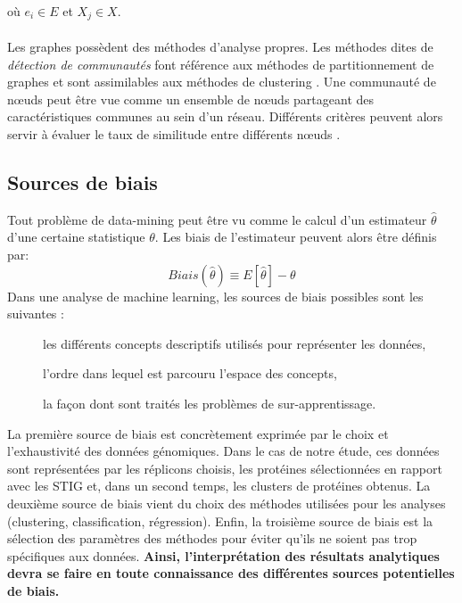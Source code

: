 où $e_{i} \in E$ et $X_{j} \in X$.\\
\\
Les graphes possèdent des méthodes d'analyse propres. Les méthodes dites de \textit{détection de communautés} font référence aux méthodes de partitionnement de graphes et sont assimilables aux méthodes de clustering \citep{Coscia2011}. Une communauté de nœuds peut être vue comme un ensemble de nœuds partageant des caractéristiques communes au sein d'un réseau. Différents critères peuvent alors servir à évaluer le taux de similitude entre différents nœuds \citep{Coscia2011}.


\subsection{Sources de biais}
Tout problème de data-mining peut être vu comme le calcul d'un estimateur $\hat{\theta}$ d'une certaine statistique $\theta$. Les biais de l'estimateur peuvent alors être définis par: 
\begin{equation}
Biais(\hat{\theta})\equiv E[\hat{\theta}]-\theta
\end{equation}
Dans une analyse de machine learning, les sources de biais possibles sont les suivantes \citep{witten2013data}: 
\begin{description}
\item[\textbullet]\small les différents concepts descriptifs utilisés pour représenter les données,
\item[\textbullet]\small l'ordre dans lequel est parcouru l'espace des concepts,
\item[\textbullet]\small la façon dont sont traités les problèmes de sur-apprentissage.
\end{description}
La première source de biais est concrètement exprimée par le choix et l'exhaustivité des données génomiques. Dans le cas de notre étude, ces données sont représentées par les réplicons choisis, les protéines sélectionnées en rapport avec les STIG et, dans un second temps, les clusters de protéines obtenus. La deuxième source de biais vient du choix des méthodes utilisées pour les analyses (clustering, classification, régression). Enfin, la troisième source de biais est la sélection des paramètres des méthodes pour éviter qu'ils ne soient pas trop spécifiques aux données. {\color{orange}\bf Ainsi, l'interprétation des résultats analytiques devra se faire en toute connaissance des différentes sources potentielles de biais.} 

